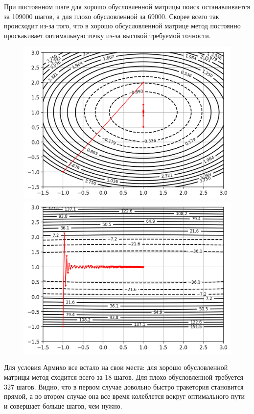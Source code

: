 \documentclass[notitlepage]{article}
\begin{document}
При постоянном шаге для хорошо обусловленной матрицы поиск останавливается за 109000 шагов, а для плохо обусловленной за 69000.
Скорее всего так происходит из-за того, что в хорошо обсусловленной матрице метод постоянно проскакивает оптимальную точку
из-за высокой требуемой точности.

\begin{figure}[ht]
\begin{minipage}[t]{.5\textwidth}
  \centering
  \includegraphics[width=\textwidth, keepaspectratio]{plots/trajectory_0_1.png}
\end{minipage}
\begin{minipage}[t]{.5\textwidth}
  \centering
  \includegraphics[width=\textwidth, keepaspectratio]{plots/trajectory_1_1.png}
\end{minipage}
\end{figure}
Для условия Армихо все встало на свои места: для хорошо обусловленной матрицы метод сходится всего за 18 шагов. Для плохо обусловленной
требуется 327 шагов. Видно, что в первом случае довольно быстро тракетория становится прямой, а во втором случае она все время
колеблется вокруг оптимального пути и совершает больше шагов, чем нужно.
\end{document}
